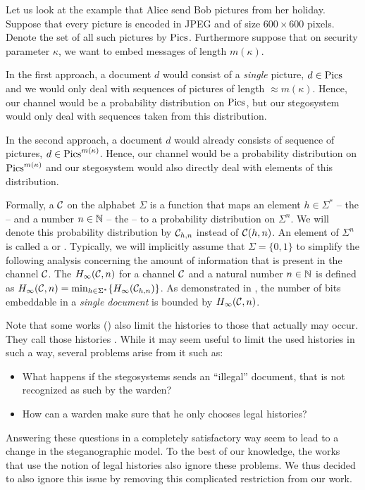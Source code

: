 \begin{example}
  Let us look at the example that Alice send Bob pictures from her
  holiday. Suppose that every picture is encoded in \acs{JPEG} and of
  size $600\times 600$ pixels. Denote the set of all such pictures by
  $\operatorname{Pics}$. Furthermore suppose that on security
  parameter $\kappa$, we want to embed messages of length $m(\kappa)$. 

  In the first approach, a document $d$ would consist of a \emph{single}
  picture, \ie $d\in \operatorname{Pics}$ and we would only deal with sequences of
  pictures of length $\approx m(\kappa)$. Hence, our channel would be a
  probability distribution on $\operatorname{Pics}$, but our stegosystem would only
  deal with sequences taken from this distribution.

  In the second approach, a document $d$ would already consists of sequence
  of pictures, \ie $d\in \operatorname{Pics}^{m(\kappa)}$. Hence, our channel would be a
  probability distribution on $\operatorname{Pics}^{m(\kappa)}$ and our stegosystem would
  also directly deal with elements of this distribution. 
\end{example}

Formally, a  $\mathcal{C}$ on the alphabet $\Sigma$ is a
function that maps an element $h\in \Sigma^{*}$ -- the 
-- and a number $n\in \mathbb{N}$ -- the  -- to a
probability distribution on $\Sigma^{n}$. We will denote this
probability distribution by $\mathcal{C}_{h,n}$ instead of
$\mathcal{C}(h,n)$. An element of $\Sigma^{n}$ is called a  or
. Typically, we will implicitly assume that
$\Sigma=\{0,1\}$ to simplify the following analysis concerning the
amount of information that is present in the channel $\mathcal{C}$. The
 $H_{\infty}(\mathcal{C},n)$ for
a channel $\mathcal{C}$ and a natural number $n\in \mathbb{N}$ is defined as
$H_{\infty}(\mathcal{C},n) = \min_{h\in \Sigma^{*}}\{H_{\infty}(\mathcal{C}_{h,n})\}$. As
demonstrated in \cite{hopper2009provably}, the number of bits embeddable
in a \emph{single document} is bounded by $H_{\infty}(\mathcal{C},n)$. 

Note that some works (\eg \cite{hopper2009provably,liskiewicz2013grey})
also limit the histories to those that actually may occur. They call
those histories . While it may seem useful to
limit the used histories in such a way, several problems arise from it
such as:
\begin{itemize}
\item What happens if the stegosystems sends an ``illegal'' document,
  that is not recognized as such by the warden?
\item How can a warden make sure that he only chooses legal histories?
\end{itemize}
Answering these questions in a completely satisfactory way seem to lead
to a change in the steganographic model. To the best of our knowledge,
the works that use the notion of legal histories also ignore these
problems. We thus decided to also ignore this issue by removing this
complicated restriction from our work. 

